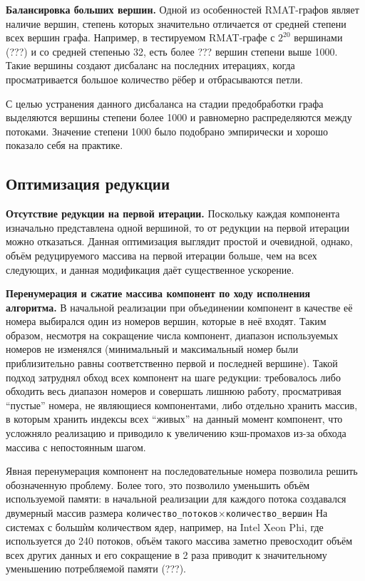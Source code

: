 \documentclass{article}
\begin{document}
\textbf{Балансировка больших вершин.}
Одной из особенностей RMAT-графов являет наличие вершин, степень которых значительно отличается от средней степени всех вершин графа. Например, в тестируемом RMAT-графе с $2^{20}$ вершинами (???) и со средней степенью 32, есть более ??? вершин степени выше 1000. Такие вершины создают дисбаланс на последних итерациях, когда просматривается большое количество рёбер и отбрасываются петли.

С целью устранения данного дисбаланса на стадии предобработки графа выделяются вершины степени более 1000 и равномерно распределяются между потоками. Значение степени 1000 было подобрано эмпирически и хорошо показало себя на практике.

\subsection{Оптимизация редукции}

\textbf{Отсутствие редукции на первой итерации.}
Поскольку каждая компонента изначально представлена одной вершиной, то от редукции на первой итерации можно отказаться. Данная оптимизация выглядит простой и очевидной, однако, объём редуцируемого массива на первой итерации больше, чем на всех следующих, и данная модификация даёт существенное ускорение.

\textbf{Перенумерация и сжатие массива компонент по ходу исполнения алгоритма.}
В начальной реализации при объединении компонент в качестве её номера выбирался один из номеров вершин, которые в неё входят. Таким образом, несмотря на сокращение числа компонент, диапазон используемых номеров не изменялся (минимальный и максимальный номер были приблизительно равны соответственно первой и последней вершине). Такой подход затруднял обход всех компонент на шаге редукции: требовалось либо обходить весь диапазон номеров и совершать лишнюю работу, просматривая ``пустые'' номера, не являющиеся компонентами, либо отдельно хранить массив, в которым хранить индексы всех ``живых'' на данный момент компонент, что усложняло реализацию и приводило к увеличению кэш-промахов из-за обхода массива с непостоянным шагом.

Явная перенумерация компонент на последовательные номера позволила решить обозначенную проблему. 
Более того, это позволило уменьшить объём используемой памяти: в начальной реализации для каждого потока создавался двумерный массив размера \texttt{количество\_потоков}$\times$\texttt{количество\_вершин}
На системах с больш\`{и}м количеством ядер, например, на Intel Xeon Phi, где используется до 240 потоков, объём такого массива заметно превосходит объём всех других данных и его сокращение в 2 раза приводит к значительному уменьшению потребляемой памяти (???).
\end{document}
